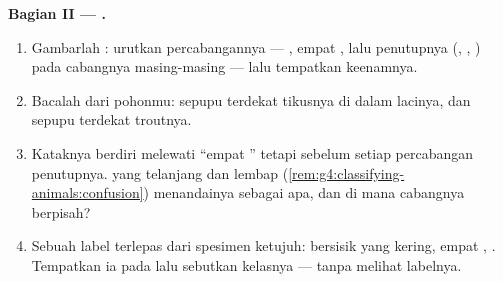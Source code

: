 \begin{problem}
\medskip\noindent\textbf{Bagian II --- .}
\begin{enumerate}[resume]
  \item Gambarlah : urutkan percabangannya --- , empat , lalu penutupnya (, , ) pada cabangnya masing-masing --- lalu tempatkan
        keenamnya.
  \item Bacalah dari pohonmu: sepupu terdekat tikusnya di dalam
        lacinya, dan sepupu terdekat  troutnya.
  \item Kataknya berdiri melewati ``empat '' tetapi
        sebelum setiap percabangan penutupnya.  yang telanjang
        dan lembap (\cref{rem:g4:classifying-animals:confusion})
        menandainya sebagai apa, dan di mana cabangnya berpisah?
  \item Sebuah label terlepas dari spesimen ketujuh:  bersisik
        yang kering, empat , . Tempatkan ia
        pada  lalu sebutkan kelasnya --- tanpa melihat
        labelnya.
\end{enumerate}


\end{problem}
